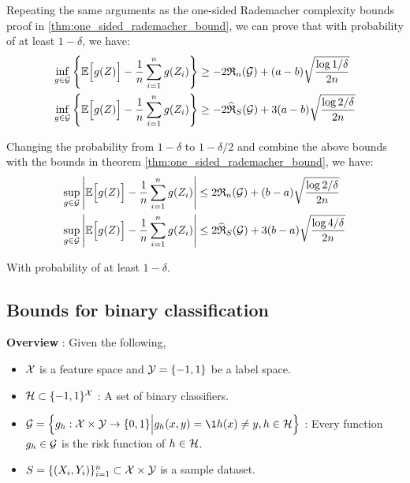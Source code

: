 \begin{proof*}
    Repeating the same arguments as the one-sided Rademacher complexity bounds proof in \ref{thm:one_sided_rademacher_bound}, we can prove that with probability of at least $1-\delta$, we have:
    \begin{align*}
        \inf_{g\in\mathcal{G}} \Bigg\{ 
            \mathbb{E}\Big[  g(Z)  \Big] - \frac{1}{n}\sum_{i=1}^n g(Z_i)
         \Bigg\} &\ge -2\mathfrak{R}_n(\mathcal{G}) + (a-b)\sqrt{
            \frac{\log 1/\delta}{2n}
        } \\
        \inf_{g\in\mathcal{G}} \Bigg\{ 
            \mathbb{E}\Big[  g(Z)  \Big] - \frac{1}{n}\sum_{i=1}^n g(Z_i)
         \Bigg\} &\ge -2\widehat{\mathfrak{R}}_S(\mathcal{G}) + 3(a-b)\sqrt{
            \frac{\log 2/\delta}{2n}
        }
    \end{align*}

    \noindent Changing the probability from $1-\delta$ to $1-\delta/2$ and combine the above bounds with the bounds in theorem \ref{thm:one_sided_rademacher_bound}, we have:
    \begin{align*}
        \sup_{g\in\mathcal{G}} \Bigg| 
            \mathbb{E}\Big[  g(Z)  \Big] - \frac{1}{n}\sum_{i=1}^n g(Z_i)
         \Bigg| &\le 2\mathfrak{R}_n(\mathcal{G}) + (b-a)\sqrt{
            \frac{\log 2/\delta}{2n}
        } \\
        \sup_{g\in\mathcal{G}} \Bigg| 
            \mathbb{E}\Big[  g(Z)  \Big] - \frac{1}{n}\sum_{i=1}^n g(Z_i)
         \Bigg| &\le 2\widehat{\mathfrak{R}}_S(\mathcal{G}) + 3(b-a)\sqrt{
            \frac{\log 4/\delta}{2n}
        }
    \end{align*}

    \noindent With probability of at least $1-\delta$.
\end{proof*}


\subsection{Bounds for binary classification}
\textbf{Overview} : Given the following, 
\begin{itemize}
    \item $\mathcal{X}$ is a feature space and $\mathcal{Y}=\{-1, 1\}$ be a label space.
    \item $\mathcal{H}\subset\{-1, 1\}^{\mathcal{X}}$ : A set of binary classifiers.
    \item $\G=\bigCurl{ g_h : \X\times\Y \to \{0,1\} \Big| g_h(x, y) = \1{h(x)\ne y}, h\in\Hf }$ : Every function $g_h\in\mathcal{G}$ is the risk function of $h\in\mathcal{H}$.
    \item $S=\{(X_i, Y_i)\}_{i=1}^n\subset \mathcal{X}\times \mathcal{Y}$ is a sample dataset.
\end{itemize}


